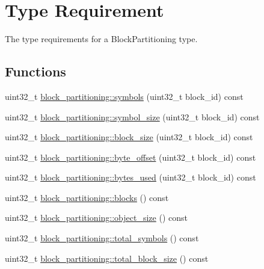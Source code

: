\hypertarget{group__block__partitioning__type}{\section{Type Requirement}
\label{group__block__partitioning__type}
}


The type requirements for a Block\-Partitioning type.  


\subsection*{Functions}
\begin{DoxyCompactItemize}
\item 
uint32\-\_\-t \hyperlink{group__block__partitioning__type_ga8bad04de0de93d2937892dfc75cb4465}{block\-\_\-partitioning\-::symbols} (uint32\-\_\-t block\-\_\-id) const 
\item 
uint32\-\_\-t \hyperlink{group__block__partitioning__type_ga98b54a11fb75aaab47e104e342db52e5}{block\-\_\-partitioning\-::symbol\-\_\-size} (uint32\-\_\-t block\-\_\-id) const 
\item 
uint32\-\_\-t \hyperlink{group__block__partitioning__type_ga972a80824c7d9c2340414900c2898e5e}{block\-\_\-partitioning\-::block\-\_\-size} (uint32\-\_\-t block\-\_\-id) const 
\item 
uint32\-\_\-t \hyperlink{group__block__partitioning__type_ga8ab6e90864470444f980462a50831105}{block\-\_\-partitioning\-::byte\-\_\-offset} (uint32\-\_\-t block\-\_\-id) const 
\item 
uint32\-\_\-t \hyperlink{group__block__partitioning__type_ga89f380a37306e2bd05c5648963e3f09d}{block\-\_\-partitioning\-::bytes\-\_\-used} (uint32\-\_\-t block\-\_\-id) const 
\item 
uint32\-\_\-t \hyperlink{group__block__partitioning__type_gaccea252dec8d637d64012a42cdcfc5c4}{block\-\_\-partitioning\-::blocks} () const 
\item 
uint32\-\_\-t \hyperlink{group__block__partitioning__type_gadfffb4576c325b7fafcbc2dd0a86062d}{block\-\_\-partitioning\-::object\-\_\-size} () const 
\item 
uint32\-\_\-t \hyperlink{group__block__partitioning__type_ga7e980680a5412664bb2e389a6ee87113}{block\-\_\-partitioning\-::total\-\_\-symbols} () const 
\item 
uint32\-\_\-t \hyperlink{group__block__partitioning__type_gafaeb4618690bbff82f8b13c87bb733ca}{block\-\_\-partitioning\-::total\-\_\-block\-\_\-size} () const 
\end{DoxyCompactItemize}



